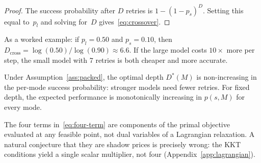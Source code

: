 \begin{proof}
The success probability after $D$ retries is $1 - (1-p_s)^D$.
Setting this equal to~$p_l$ and solving for~$D$ gives~\eqref{eq:crossover}.
\end{proof}

As a worked example: if $p_l = 0.50$ and $p_s = 0.10$, then
$D_{\mathrm{cross}} = \log(0.50)/\log(0.90) \approx 6.6$.
If the large model costs $10\times$ more per step, the small model
with 7 retries is both cheaper and more accurate.

\begin{corollary}[Monotonicity]
\label{cor:monotonicity}
Under Assumption~\ref{ass:packed}, the optimal depth $D^*(M)$ is
non-increasing in the per-mode success probability: stronger models need
fewer retries.  For fixed depth, the expected performance is monotonically
increasing in $p(s,M)$ for every mode.
\end{corollary}

\begin{remark}
\label{rem:lagrangian}
The four terms in~\eqref{eq:four-term} are components of the primal
objective evaluated at any feasible point, not dual variables of a
Lagrangian relaxation.  A natural conjecture that they are shadow prices
is precisely wrong: the KKT conditions yield a single scalar multiplier,
not four (Appendix~\ref{app:lagrangian}).
\end{remark}
